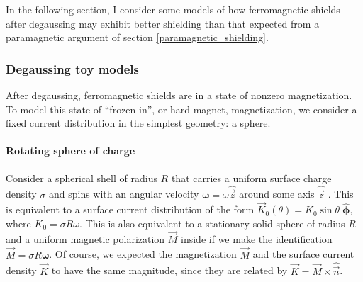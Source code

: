 In the following section, I consider some models of how ferromagnetic
shields after degaussing may exhibit better shielding than that expected from a
paramagnetic argument of section \ref{paramagnetic_shielding}.

\subsubsection{Degaussing toy models}

After degaussing, ferromagnetic shields are in a state of nonzero magnetization.
To model this state of ``frozen in'', or hard-magnet, magnetization, we consider
a fixed current distribution in the simplest geometry: a sphere.

\paragraph{Rotating sphere of charge}

Consider a spherical shell of radius $R$ that carries a uniform surface charge
density $\sigma$ and spins with an angular velocity
$\boldsymbol\omega=\omega\hat{\vec z}$ around some axis $\hat{\vec z}$
\cite[Ex.~5.11]{griffiths2013introduction}.  This is equivalent to a surface
current distribution of the form $\vec
K_0(\theta)=K_0\sin\theta\;\hat{\boldsymbol\phi},$ where $K_0=\sigma R\omega$.
This is also equivalent to a stationary solid sphere of radius $R$ and a uniform
magnetic polarization $\vec M$ inside \cite[sect~5.10]{jackson1998classical} if
we make the identification $\vec M=\sigma R\boldsymbol\omega$. Of course, we
expected the magnetization $\vec M$ and the surface current density $\vec K$ to
have the same magnitude, since they are related by $\vec K=\vec M\times\hat{\vec
n}$.

